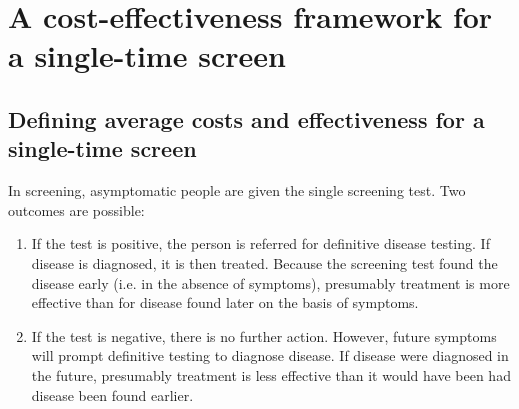 \documentclass[11pt, letterpaper]{article}
\begin{document}



\section{A cost-effectiveness framework for a single-time screen}

\subsection{Defining average costs and effectiveness for a single-time screen} 
\label{sec:framework}

In screening, asymptomatic people are given the single screening test.  Two outcomes are possible:
\begin{enumerate}
	\item If the test is positive, the person is referred for definitive disease testing.  If disease is diagnosed, it is then treated.  Because the screening test found the disease early (i.e. in the absence of symptoms), presumably treatment is more effective than for disease found later on the basis of symptoms.
	
	\item If the test is negative, there is no further action.  However, future symptoms will prompt definitive testing to diagnose disease.  If disease were diagnosed in the future, presumably treatment is less effective than it would have been had disease been found earlier.
\end{enumerate}
\end{document}
